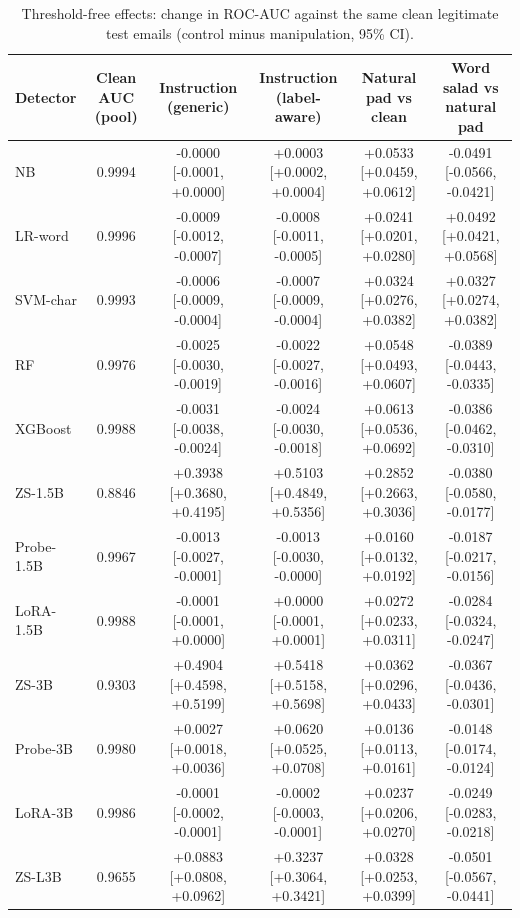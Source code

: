 \begin{table}[t]
\centering
\caption{Threshold-free effects: change in ROC-AUC against the same clean legitimate test emails (control minus manipulation, 95\% CI).}
\label{tab:auc}
\footnotesize
\begin{tabular}{lccccc}
\toprule
\textbf{Detector} & \textbf{Clean AUC (pool)} & \textbf{Instruction (generic)} & \textbf{Instruction (label-aware)} & \textbf{Natural pad vs clean} & \textbf{Word salad vs natural pad} \\
\midrule
NB & 0.9994 & -0.0000 [-0.0001, +0.0000] & +0.0003 [+0.0002, +0.0004] & +0.0533 [+0.0459, +0.0612] & -0.0491 [-0.0566, -0.0421] \\
LR-word & 0.9996 & -0.0009 [-0.0012, -0.0007] & -0.0008 [-0.0011, -0.0005] & +0.0241 [+0.0201, +0.0280] & +0.0492 [+0.0421, +0.0568] \\
SVM-char & 0.9993 & -0.0006 [-0.0009, -0.0004] & -0.0007 [-0.0009, -0.0004] & +0.0324 [+0.0276, +0.0382] & +0.0327 [+0.0274, +0.0382] \\
RF & 0.9976 & -0.0025 [-0.0030, -0.0019] & -0.0022 [-0.0027, -0.0016] & +0.0548 [+0.0493, +0.0607] & -0.0389 [-0.0443, -0.0335] \\
XGBoost & 0.9988 & -0.0031 [-0.0038, -0.0024] & -0.0024 [-0.0030, -0.0018] & +0.0613 [+0.0536, +0.0692] & -0.0386 [-0.0462, -0.0310] \\
ZS-1.5B & 0.8846 & +0.3938 [+0.3680, +0.4195] & +0.5103 [+0.4849, +0.5356] & +0.2852 [+0.2663, +0.3036] & -0.0380 [-0.0580, -0.0177] \\
Probe-1.5B & 0.9967 & -0.0013 [-0.0027, -0.0001] & -0.0013 [-0.0030, -0.0000] & +0.0160 [+0.0132, +0.0192] & -0.0187 [-0.0217, -0.0156] \\
LoRA-1.5B & 0.9988 & -0.0001 [-0.0001, +0.0000] & +0.0000 [-0.0001, +0.0001] & +0.0272 [+0.0233, +0.0311] & -0.0284 [-0.0324, -0.0247] \\
ZS-3B & 0.9303 & +0.4904 [+0.4598, +0.5199] & +0.5418 [+0.5158, +0.5698] & +0.0362 [+0.0296, +0.0433] & -0.0367 [-0.0436, -0.0301] \\
Probe-3B & 0.9980 & +0.0027 [+0.0018, +0.0036] & +0.0620 [+0.0525, +0.0708] & +0.0136 [+0.0113, +0.0161] & -0.0148 [-0.0174, -0.0124] \\
LoRA-3B & 0.9986 & -0.0001 [-0.0002, -0.0001] & -0.0002 [-0.0003, -0.0001] & +0.0237 [+0.0206, +0.0270] & -0.0249 [-0.0283, -0.0218] \\
ZS-L3B & 0.9655 & +0.0883 [+0.0808, +0.0962] & +0.3237 [+0.3064, +0.3421] & +0.0328 [+0.0253, +0.0399] & -0.0501 [-0.0567, -0.0441] \\

\end{tabular}
\end{table}
